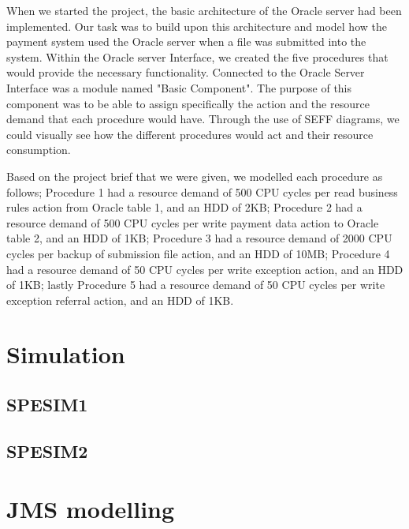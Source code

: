 \documentclass[a4paper,11pt]{report}
\begin{document}
When we started the project, the basic architecture of the Oracle server had been implemented. Our task was to build upon this architecture and model how the payment system used the Oracle server when a file was submitted into the system. Within the Oracle server Interface, we created the five procedures that would provide the necessary functionality. Connected to the Oracle Server Interface was a module named "Basic Component". The purpose of this component was to be able to assign specifically the action and the resource demand that each procedure would have. Through the use of SEFF diagrams, we could visually see how the different procedures would act and their resource consumption.

Based on the project brief that we were given, we modelled each procedure as follows; Procedure 1 had a resource demand of 500 CPU cycles per read business rules action from Oracle table 1, and an HDD of 2KB; Procedure 2 had a resource demand of 500 CPU cycles per write payment data action to Oracle table 2, and an HDD of 1KB; Procedure 3 had a resource demand of 2000 CPU cycles per backup of submission file action, and an HDD of 10MB; Procedure 4 had a resource demand of 50 CPU cycles per write exception action, and an HDD of 1KB; lastly Procedure 5 had a resource demand of 50 CPU cycles per write exception referral action, and an HDD of 1KB. 

\chapter*{Simulation}

\section*{SPESIM1}

\section*{SPESIM2}

\chapter*{JMS modelling}
\end{document}
